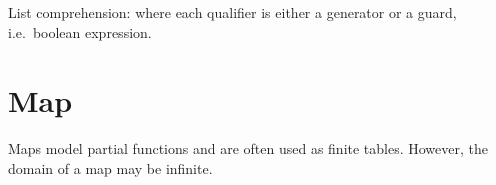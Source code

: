 \begin{isabellebody}
\begin{isamarkuptext}
List comprehension:  where each
qualifier  is either a generator \mbox{} or a
guard, i.e.\ boolean expression.

\section{Map}

Maps model partial functions and are often used as finite tables. However,
the domain of a map may be infinite.

\bigskip


\end{isamarkuptext}
\end{isabellebody}
